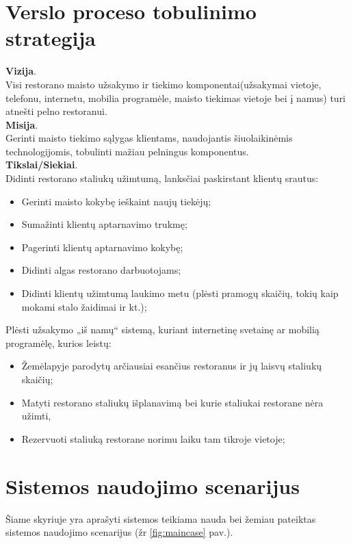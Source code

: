 \documentclass{VUMIFPSkursinis}
\begin{document}
\section{Verslo proceso tobulinimo strategija}
\noindent \textbf{Vizija}.\\
Visi restorano maisto užsakymo ir tiekimo komponentai(užsakymai vietoje, telefonu, internetu, mobilia programėle, maisto tiekimas vietoje bei į namus) turi atnešti pelno restoranui.\\
\textbf{Misija}.\\
Gerinti maisto tiekimo sąlygas klientams, naudojantis šiuolaikinėmis technologijomis, tobulinti mažiau pelningus komponentus.\\
\textbf{Tikslai/Siekiai}.\\
Didinti restorano staliukų užimtumą, lanksčiai paskirstant klientų srautus:
	\begin{itemize}
	\item Gerinti maisto kokybę ieškaint naujų tiekėjų;
	\item Sumažinti klientų aptarnavimo trukmę;
	\item Pagerinti klientų aptarnavimo kokybę;
	\item Didinti algas restorano darbuotojams;
	\item Didinti klientų užimtumą laukimo metu (plėsti pramogų skaičių, tokių kaip mokami stalo žaidimai ir kt.);
	\end{itemize}
Plėsti užsakymo „iš namų“ sistemą, kuriant internetinę svetainę ar mobilią programėlę, kurios leistų:
	\begin{itemize}
	\item Žemėlapyje parodytų arčiausiai esančius restoranus ir jų laisvų staliukų skaičių;
	\item Matyti restorano staliukų išplanavimą bei kurie staliukai restorane nėra užimti,
	\item Rezervuoti staliuką restorane norimu laiku tam tikroje vietoje;
	\end{itemize}

\section{Sistemos naudojimo scenarijus}

Šiame skyriuje yra aprašyti sistemos teikiama nauda bei žemiau pateiktas sistemos naudojimo scenarijus (žr \ref{fig:maincase} pav.).

\end{document}
